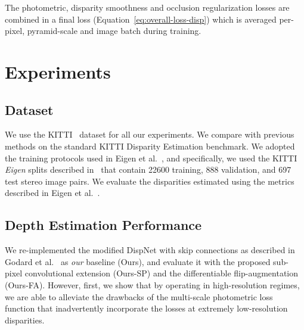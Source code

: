 \documentclass[letterpaper, 10 pt, conference]{ieeeconf}  \IEEEoverridecommandlockouts
\begin{document}
The photometric, disparity smoothness and occlusion regularization losses are combined in a final loss (Equation~\ref{eq:overall-loss-disp}) which is averaged per-pixel, pyramid-scale and image batch during training. 














 






 \section{Experiments}
\label{sec:experiments}

\subsection{Dataset}

We use the KITTI~\cite{geiger2013vision} dataset for all our experiments. We compare with previous methods on the standard KITTI Disparity Estimation benchmark. We adopted the training protocols used in Eigen et al.~\cite{eigen2014depth}, and specifically, we used the KITTI \textit{Eigen} splits described in~\cite{eigen2014depth} that contain 22600 training, 888 validation, and 697 test stereo image pairs. We evaluate the disparities estimated using the metrics described in Eigen et al.~\cite{eigen2014depth}. 





\subsection{Depth Estimation Performance}
We re-implemented the modified DispNet with skip connections as described in Godard et al.~\cite{godard2017unsupervised} as \textit{our} baseline (Ours), and evaluate it with the proposed sub-pixel convolutional extension (Ours-SP) and the differentiable flip-augmentation (Ours-FA). However, first, we show that by operating in high-resolution regimes, we are able to alleviate the drawbacks of the multi-scale photometric loss function that inadvertently incorporate the losses at extremely low-resolution disparities. 
\end{document}
